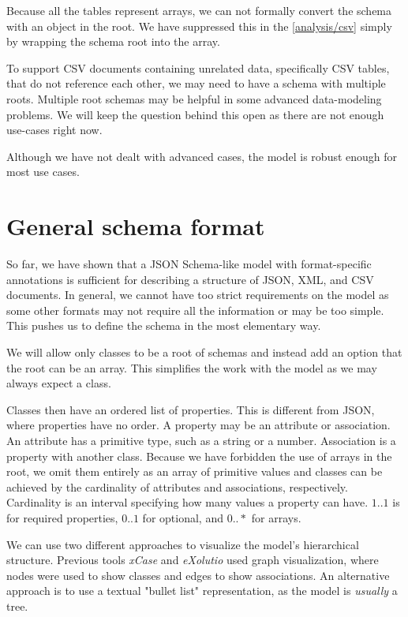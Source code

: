 Because all the tables represent arrays, we can not formally convert the schema with an object in the root. We have suppressed this in the \autoref{analysis/csv} simply by wrapping the schema root into the array.

To support CSV documents containing unrelated data, specifically CSV tables, that do not reference each other, we may need to have a schema with multiple roots. Multiple root schemas may be helpful in some advanced data-modeling problems. We will keep the question behind this open as there are not enough use-cases right now.

Although we have not dealt with advanced cases, the model is robust enough for most use cases.

\section*{General schema format}

So far, we have shown that a JSON Schema-like model with format-specific annotations is sufficient for describing a structure of JSON, XML, and CSV documents. In general, we cannot have too strict requirements on the model as some other formats may not require all the information or may be too simple. This pushes us to define the schema in the most elementary way.

\medskip

We will allow only classes to be a root of schemas and instead add an option that the root can be an array. This simplifies the work with the model as we may always expect a class.

Classes then have an ordered list of properties. This is different from JSON, where properties have no order. A property may be an attribute or association. An attribute has a primitive type, such as a string or a number. Association is a property with another class. Because we have forbidden the use of arrays in the root, we omit them entirely as an array of primitive values and classes can be achieved by the cardinality of attributes and associations, respectively. Cardinality is an interval specifying how many values a property can have. $1..1$ is for required properties, $0..1$ for optional, and $0..*$ for arrays.

\smallskip

We can use two different approaches to visualize the model's hierarchical structure. Previous tools \textit{xCase} and \textit{eXolutio} used graph visualization, where nodes were used to show classes and edges to show associations. An alternative approach is to use a textual "bullet list" representation, as the model is \textit{usually} a tree.

